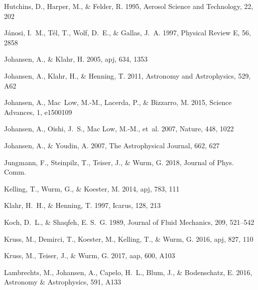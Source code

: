 \begin{thebibliography}{}
Hutchins, D., Harper, M., \& Felder, R. 1995, Aerosol Science and Technology,
  22, 202

J{\'a}nosi, I.~M., T{\'e}l, T., Wolf, D.~E., \& Gallas, J.~A. 1997, Physical
  Review E, 56, 2858

{Johansen}, A., \& {Klahr}, H. 2005, apj, 634, 1353

{Johansen}, A., {Klahr}, H., \& {Henning}, T. 2011, Astronomy and Astrophysics,
  529, A62

Johansen, A., Mac~Low, M.-M., Lacerda, P., \& Bizzarro, M. 2015, Science
  Advances, 1, e1500109

{Johansen}, A., {Oishi}, J.~S., {Mac Low}, M.-M., {et~al.} 2007, Nature, 448,
  1022

Johansen, A., \& Youdin, A. 2007, The Astrophysical Journal, 662, 627

{Jungmann}, F., {Steinpilz}, T., {Teiser}, J., \& {Wurm}, G. 2018, Journal of
  Phys. Comm.

{Kelling}, T., {Wurm}, G., \& {Koester}, M. 2014, apj, 783, 111

Klahr, H.~H., \& Henning, T. 1997, Icarus, 128, 213

Koch, D.~L., \& Shaqfeh, E. S.~G. 1989, Journal of Fluid Mechanics, 209,
  521–542

{Kruss}, M., {Demirci}, T., {Koester}, M., {Kelling}, T., \& {Wurm}, G. 2016,
  apj, 827, 110

{Kruss}, M., {Teiser}, J., \& {Wurm}, G. 2017, aap, 600, A103

Lambrechts, M., Johansen, A., Capelo, H.~L., Blum, J., \& Bodenschatz, E. 2016,
  Astronomy \& Astrophysics, 591, A133


\end{thebibliography}
